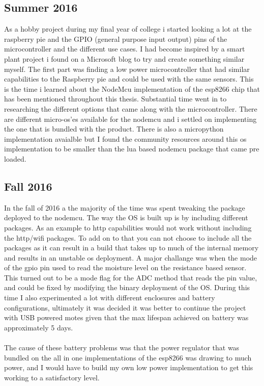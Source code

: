 \documentclass[]{uiophd}
\begin{document}
\subsection{Summer 2016}
As a hobby project during my final year of college i started looking a lot at the raspberry pie and the GPIO (general purpose input output) pins of the microcontroller and the different use cases. I had become inspired by a smart plant project i found on a Microsoft blog to try and create something similar myself. The first part was finding a low power microcontroller that had similar capabilities to the Raspberry pie and could be used with the same sensors. This is the time i learned about the NodeMcu implementation of the esp8266 chip that has been mentioned throughout this thesis. Substantial time went in to researching the different options that came along with the microcontroller. There are different micro-os'es available for the nodemcu and i settled on implementing the one that is bundled with the product. There is also a micropython implementation avaialble but I found the community resources around this os implementation to be smaller than the lua based nodemcu package that came pre loaded.
\subsection{Fall 2016}
In the fall of 2016 a the majority of the time was spent tweaking the package deployed to the nodemcu. The way the OS is built up is by including different packages. As an example to http capabilities would not work without including the http/wifi packages. To add on to that you can not choose to include all the packages as it can result in a build that takes up to much of the internal memory and results in an unstable os deployment. A major challange was when the mode of the gpio pin used to read the moisture level on the resistance based sensor. This turned out to be a mode flag for the ADC method that reads the pin value, and could be fixed by modifying the binary deployment of the OS. During this time I also experimented a lot with different enclosures and battery configurations, ultimately it was decided it was better to continue the project with USB powered motes given that the max lifespan achieved on battery was approximately 5 days.
\\\\
The cause of these battery problems was that the power regulator that was bundled on the all in one implementations of the esp8266 was drawing to much power, and I would have to build my own low power implementation to get this working to a satisfactory level.
\end{document}
